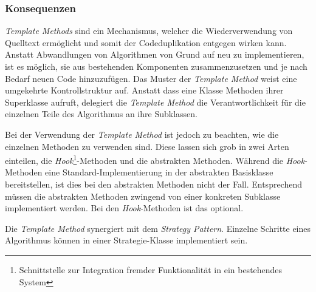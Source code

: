 \subsubsection*{Konsequenzen}

\emph{Template Methods} sind ein Mechanismus, welcher die Wiederverwendung von Quelltext ermöglicht und somit der Codeduplikation entgegen wirken kann. Anstatt Abwandlungen von Algorithmen von Grund auf neu zu implementieren, ist es möglich, sie aus bestehenden Komponenten zusammenzusetzen und je nach Bedarf neuen Code hinzuzufügen. Das Muster der \emph{Template Method} weist eine umgekehrte Kontrollstruktur auf. Anstatt dass eine Klasse Methoden ihrer Superklasse aufruft, delegiert die \emph{Template Method} die Verantwortlichkeit für die einzelnen Teile des Algorithmus an ihre Subklassen.

Bei der Verwendung der \emph{Template Method} ist jedoch zu beachten, wie die einzelnen Methoden zu verwenden sind. Diese lassen sich grob in zwei Arten einteilen, die \emph{Hook}\footnote{Schnittstelle zur Integration fremder Funktionalität in ein bestehendes System}-Methoden und die abstrakten Methoden. Während die \emph{Hook}-Methoden eine Standard-Implementierung in der abstrakten Basisklasse bereitstellen, ist dies bei den abstrakten Methoden nicht der Fall. Entsprechend müssen die abstrakten Methoden zwingend von einer konkreten Subklasse implementiert werden. Bei den \emph{Hook}-Methoden ist das optional.

Die \emph{Template Method} synergiert mit dem \emph{Strategy Pattern}. Einzelne Schritte eines Algorithmus können in einer Strategie-Klasse implementiert sein. \cite{gamma_design_1995}